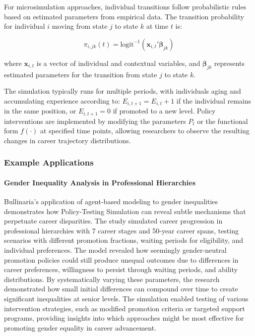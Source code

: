 \documentclass[main.tex]{subfiles}
\begin{document}
For microsimulation approaches, individual transitions follow probabilistic rules based on estimated parameters from empirical data\autocite{duc2015, bronka2023}. The transition probability for individual $i$ moving from state $j$ to state $k$ at time $t$ is:

\[
    \pi_{i,jk}(t) = \text{logit}^{-1}(\mathbf{x}_{i,t}'\boldsymbol{\beta}_{jk})
\]

where $\mathbf{x}_{i,t}$ is a vector of individual and contextual variables, and $\boldsymbol{\beta}_{jk}$ represents estimated parameters for the transition from state $j$ to state $k$\autocite{bronka2023}.

The simulation typically runs for multiple periods, with individuals aging and accumulating experience according to: $E_{i,t+1} = E_{i,t} + 1$ if the individual remains in the same position, or $E_{i,t+1} = 0$ if promoted to a new level\autocite{bullinaria2018}. Policy interventions are implemented by modifying the parameters $P_t$ or the functional form $f(\cdot)$ at specified time points, allowing researchers to observe the resulting changes in career trajectory distributions.

\subsubsection{Example Applications}

\paragraph{Gender Inequality Analysis in Professional Hierarchies}

Bullinaria's application of agent-based modeling to gender inequalities demonstrates how Policy-Testing Simulation can reveal subtle mechanisms that perpetuate career disparities\autocite{bullinaria2018}. The study simulated career progression in professional hierarchies with 7 career stages and 50-year career spans, testing scenarios with different promotion fractions, waiting periods for eligibility, and individual preferences. The model revealed how seemingly gender-neutral promotion policies could still produce unequal outcomes due to differences in career preferences, willingness to persist through waiting periods, and ability distributions. By systematically varying these parameters, the research demonstrated how small initial differences can compound over time to create significant inequalities at senior levels. The simulation enabled testing of various intervention strategies, such as modified promotion criteria or targeted support programs, providing insights into which approaches might be most effective for promoting gender equality in career advancement.
\end{document}
